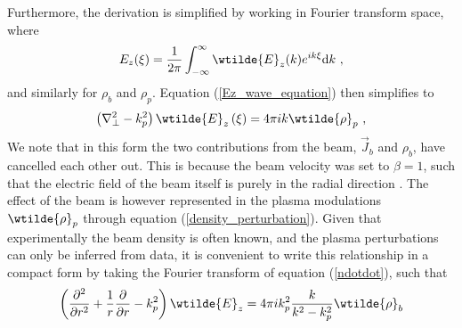 Furthermore, the derivation is simplified by working in Fourier transform space, where
\begin{equation}
E_z(\xi)=\frac{1}{2\pi}\int_ {-\infty}^{\infty}\wtilde{E}_z(k)e^{ik\xi}\mathrm{d}k~,
\end{equation}
and similarly for $\rho_b$ and $\rho_p$. Equation (\ref{Ez_wave_equation}) then simplifies to
\begin{equation}
\left(\nabla^2_{\perp}-k^2_p\right)\wtilde{E}_z\left(\xi\right)=4\pi i k\wtilde{\rho}_p~,
\end{equation}
We note that in this form the two contributions from the beam, $\vec{J}_b$ and $\rho_b$, have cancelled each other out. This is because the beam velocity was set to $\beta=1$, such that the electric field of the beam itself is purely in the radial direction \citep{Gessner2016}. The effect of the beam is however represented in the plasma modulations $\wtilde{\rho}_p$ through equation (\ref{density_perturbation}). Given that experimentally the beam density is often known, and the plasma perturbations can only be inferred from data, it is convenient to write this relationship in a compact form by taking the Fourier transform of equation (\ref{ndotdot}), such that
\begin{equation}
 \left(\frac{\partial^2 }{\partial r^2}+\frac{1}{r}\frac{\partial }{\partial r} -k^2_p\right)\wtilde{E}_z
=4\pi ik_p^2 \frac{k}{k^2-k_p^2}\wtilde{\rho}_b
\label{diffeq_in_transformspace}
\end{equation}
